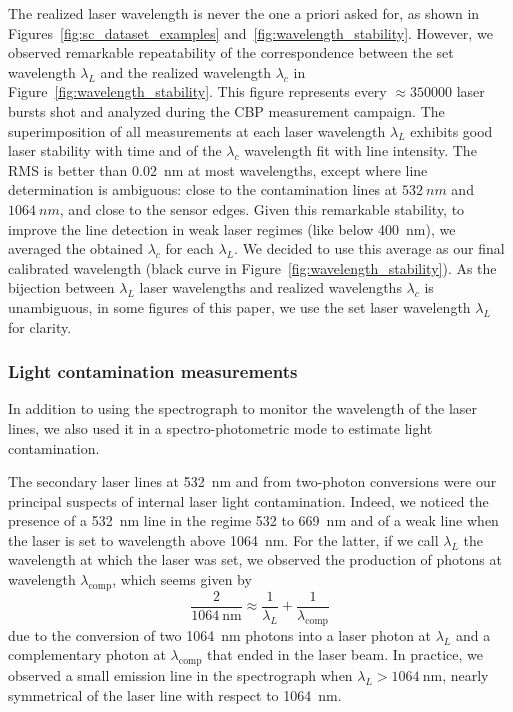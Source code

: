 The realized laser wavelength is never the one a priori asked for, as shown in Figures~\ref{fig:sc_dataset_examples} and~\ref{fig:wavelength_stability}. However, we observed remarkable repeatability of the correspondence between the set wavelength $\lambda_L$ and the realized wavelength $\lambda_c$ in Figure~\ref{fig:wavelength_stability}. This figure represents every $\approx\num{350000}$ laser bursts shot and analyzed during the CBP measurement campaign. The superimposition of all measurements at each laser wavelength $\lambda_L$ exhibits good laser stability with time and of the $\lambda_c$ wavelength fit with line intensity. The RMS is better than \SI{0.02}{\nm} at most wavelengths, except where line determination is ambiguous: close to the contamination lines at $\SI{532}{nm}$ and $\SI{1064}{nm}$, and close to the sensor edges. Given this remarkable stability, to improve the line detection in weak laser regimes (like below \SI{400}{\nm}), we averaged the obtained $\lambda_c$ for each $\lambda_L$. We decided to use this average as our final calibrated wavelength (black curve in Figure~\ref{fig:wavelength_stability}). As the bijection between $\lambda_L$ laser wavelengths and realized wavelengths $\lambda_c$ is unambiguous, in some figures of this paper, we use the set laser wavelength $\lambda_L$ for clarity. 




\subsubsection{Light contamination measurements}
\label{lightcontamination}
In addition to using the spectrograph to monitor the wavelength of the laser lines, we also used it in a spectro-photometric mode to estimate light contamination.


The secondary laser lines at \SI{532}{\nm} and from two-photon conversions were our principal suspects of internal laser light contamination. Indeed, we noticed the presence of a \SI{532}{\nm} line in the regime 532 to \SI{669}{\nm} and of a weak line when the laser is set to wavelength above \SI{1064}{\nm}. For the latter, if we call $\lambda_L$ the wavelength at which the laser was set, we observed the production of photons at wavelength $\lambda_{\text{comp}}$, which seems given by
\begin{equation}
 \frac{2}{\SI{1064}{\nm}} \approx \frac{1}{\lambda_L} + \frac{1}{\lambda_{\text{comp}}}
 \end{equation} 
 due to the conversion of two \SI{1064}{\nm} photons into a laser photon at $\lambda_L$ and a complementary photon at $\lambda_{\text{comp}}$ that ended in the laser beam. In practice, we observed a small emission line in the spectrograph when $\lambda_L > \SI{1064}{\nm}$, nearly symmetrical of the laser line with respect to \SI{1064}{\nm}.

